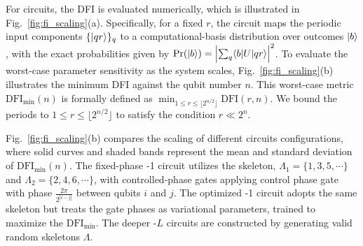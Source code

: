 \documentclass[reprint, aps, prl, superscriptaddress]{revtex4-2}
\newcommand{\myqc}{\text{HP}}
\newcommand{\fii}{\mathrm{DFI}}
\begin{document}
For \myqc{} circuits, the DFI is evaluated numerically, which is illustrated in Fig.~\ref{fig:fi_scaling}(a). Specifically, for a fixed $r$, the circuit maps the periodic input components $\{\ket{qr}\}_q$ to a computational-basis distribution over outcomes $\ket{b}$, with the exact probabilities given by $\mathrm{Pr}(\ket{b}) = \left|\sum_q \langle b|U|qr\rangle\right|^2$.
To evaluate the worst-case parameter sensitivity as the system scales, Fig.~\ref{fig:fi_scaling}(b) illustrates the minimum DFI against the qubit number $n$. This worst-case metric $\fii_{\min}(n)$ is formally defined as $\min_{1 \leq r \leq \lfloor 2^{n/2} \rfloor} \fii(r,n)$.
We bound the periods to $1 \leq r \leq \lfloor 2^{n/2} \rfloor$ to satisfy the condition $r \ll 2^n$.

Fig.~\ref{fig:fi_scaling}(b) compares the scaling of different \myqc circuits configurations, where solid curves and shaded bands represent the mean and standard deviation of $\fii_{\min}(n)$. The fixed-phase \myqc-1 circuit utilizes the skeleton, $\Lambda_1 = \{1,3,5, \cdots\}$ and $\Lambda_2 = \{2,4,6, \cdots\}$, with controlled-phase gates applying control phase gate with phase $\frac{2\pi}{2^{|i-j|}}$ between qubits $i$ and $j$. The optimized \myqc-1 circuit adopts the same skeleton but treats the gate phases as variational parameters, trained to maximize the $\fii_{\min}$. The deeper \myqc{}-$L$ circuits are constructed by generating valid random skeletons $\Lambda$. 
\end{document}

